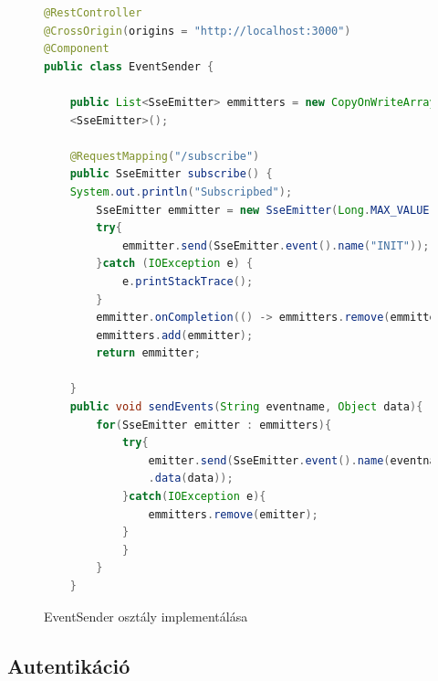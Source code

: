 \documentclass[a4paper,twoside]{article}
\begin{document}
\begin{figure}[ht]
	\caption{EventSender osztály implementálása}
	\begin{minipage}{\textwidth}
	\begin{lstlisting}[language=java,breaklines=true]	
@RestController
@CrossOrigin(origins = "http://localhost:3000")
@Component
public class EventSender {
		
	public List<SseEmitter> emmitters = new CopyOnWriteArrayList
	<SseEmitter>();
		
	@RequestMapping("/subscribe")
	public SseEmitter subscribe() {
	System.out.println("Subscripbed");
		SseEmitter emmitter = new SseEmitter(Long.MAX_VALUE);
		try{
			emmitter.send(SseEmitter.event().name("INIT"));
		}catch (IOException e) {
			e.printStackTrace();
		}
		emmitter.onCompletion(() -> emmitters.remove(emmitter));
		emmitters.add(emmitter);
		return emmitter;
		
	}
	public void sendEvents(String eventname, Object data){
		for(SseEmitter emitter : emmitters){
			try{
				emitter.send(SseEmitter.event().name(eventname)
				.data(data));
			}catch(IOException e){
				emmitters.remove(emitter);
			}
			}
		}
	}
	\end{lstlisting}
	\end{minipage}
	\label{eventsender}
\end{figure} 
\FloatBarrier


\subsection{Autentikáció}
\end{document}
